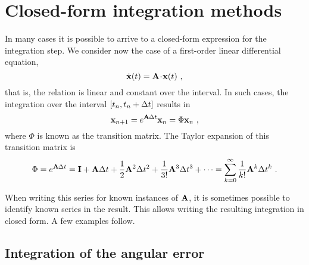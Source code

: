 
\section{Closed-form integration methods}
\label{sec:ClosedFormInt}

In many cases it is possible to arrive to a closed-form expression for the integration step. 
We consider now the case of a first-order linear differential equation,
%
\begin{equation}
\dot{{\bf x}}(t)={\bf A}\!\cdot\!{\bf x}(t)~,
\end{equation}
%
that is, the relation is linear and constant over the interval. 
In such cases, the integration over the interval $[t_n , t_n+\Delta t]$ results in
%
\begin{equation}
{\bf x}_{n+1}= e^{{\bf A}\!\cdot\!\Delta t}{\bf x}_n = \Phi{\bf x}_n~,
\end{equation}
%
where $\Phi$ is known as the transition matrix. 
The Taylor expansion of this transition matrix is
%
\begin{equation}
\Phi= e^{{\bf A}\!\cdot\!\Delta t}={\bf I} + {\bf A}\Delta t + \frac{1}{2} {\bf A}^2\Delta t^2 + \frac{1}{3!}{\bf A}^3\Delta t^3 + \dots   = \sum_{k=0}^\infty \frac{1}{k!}{\bf A}^k\Delta t^k ~.
\label{equ:TaylorExp}
\end{equation}


When writing this series for known instances of ${\bf A}$, it is sometimes possible to identify known series in the result. 
This allows writing the resulting integration in closed form. 
A few examples follow.

\subsection{Integration of the angular error}
\label{sec:ClosedFormAngle}

